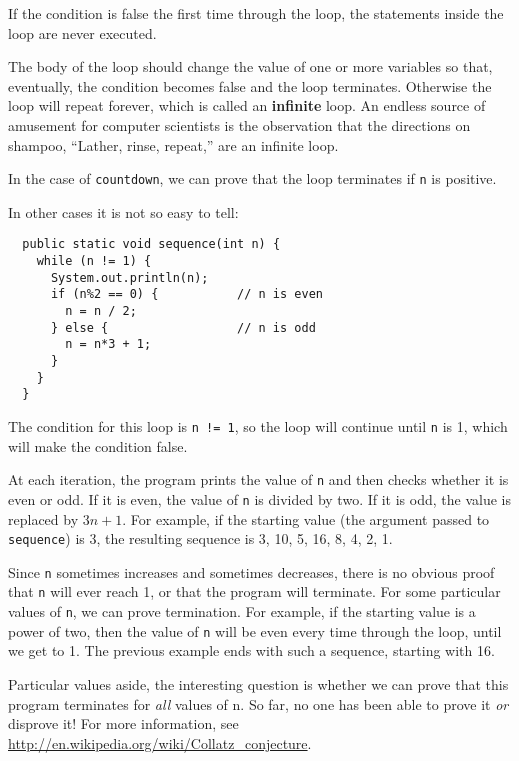 \documentclass{book}
\begin{document}
If the condition is false the
first time through the loop, the statements inside the loop are
never executed.  


The body of the loop should change the value of
one or more variables so that, eventually, the condition becomes
false and the loop terminates.  Otherwise the loop will repeat
forever, which is called an {\bf infinite} loop.  An endless
source of amusement for computer scientists is the observation
that the directions on shampoo, ``Lather, rinse, repeat,'' are
an infinite loop.

In the case of {\tt countdown}, we can prove that the loop
terminates if {\tt n} is positive.

In other cases it is not so easy to tell:

\begin{verbatim}
  public static void sequence(int n) {
    while (n != 1) {
      System.out.println(n);
      if (n%2 == 0) {           // n is even
        n = n / 2;
      } else {                  // n is odd
        n = n*3 + 1;
      }
    }
  }
\end{verbatim}
%
The condition for this loop is {\tt n != 1}, so the loop
will continue until {\tt n} is 1, which will make the condition
false.

At each iteration, the program prints the value of {\tt n} and then
checks whether it is even or odd.  If it is even, the value of
{\tt n} is divided by two.  If it is odd, the value is replaced
by $3n+1$.  For example, if the starting value (the argument passed
to {\tt sequence}) is 3, the resulting sequence is
3, 10, 5, 16, 8, 4, 2, 1.

Since {\tt n} sometimes increases and sometimes decreases, there is no
obvious proof that {\tt n} will ever reach 1, or that the program will
terminate.  For some particular values of {\tt n}, we can prove
termination.  For example, if the starting value is a power of two, then
the value of {\tt n} will be even every time through the loop, until
we get to 1.  The previous example ends with such a sequence,
starting with 16.

Particular values aside, the interesting question is whether
we can prove that this program terminates for {\em all} values of n.
So far, no one has been able to prove it {\em or} disprove it!
For more information, see \url{http://en.wikipedia.org/wiki/Collatz_conjecture}.
\end{document}
